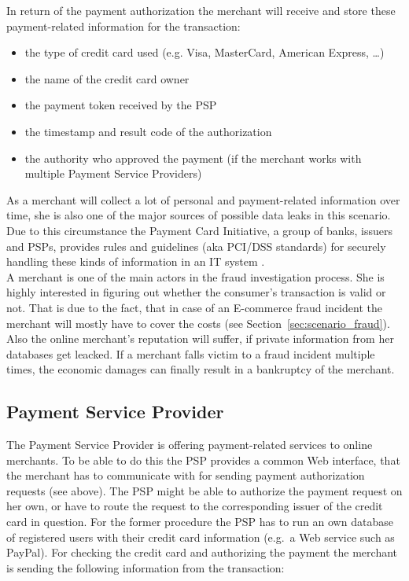 In return of the payment authorization the merchant will receive and store these  payment-related information for the transaction:\@

\begin{itemize}
		\item the type of credit card used (e.g. Visa, MasterCard, American Express, \ldots)
		\item the name of the credit card owner
		\item the payment token received by the \gls{PSP}
		\item the timestamp and result code of the authorization
		\item the authority who approved the payment (if the merchant works with multiple Payment Service Providers)
\end{itemize}

As a merchant will collect a lot of personal and payment-related information over time, she is also one of the major sources of possible data leaks in this scenario. Due to this circumstance the Payment Card Initiative, a group of banks, issuers and \gls{PSP}s, provides rules and guidelines (aka PCI/DSS standards) for securely handling these kinds of information in an IT system \citep{virtue2009payment}. \\

A merchant is one of the main actors in the fraud investigation process. She is highly interested in figuring out whether the consumer's transaction is valid or not. That is due to the fact, that in case of an E-commerce fraud incident the merchant will mostly have to cover the costs (see Section~\ref{sec:scenario_fraud}). Also the online merchant's reputation will suffer, if private information from her databases get leacked. If a merchant falls victim to a fraud incident multiple times, the economic damages can finally result in a bankruptcy of the merchant.


\subsection{Payment Service Provider}
\label{subsec:stakeholder_psp}

The Payment Service Provider is offering payment-related services to online merchants. To be able to do this the \gls{PSP} provides a common Web interface, that the merchant has to communicate with for sending payment authorization requests (see above). The \gls{PSP} might be able to authorize the payment request on her own, or have to route the request to the corresponding issuer of the credit card in question. For the former procedure the \gls{PSP} has to run an own database of registered users with their credit card information (e.g.\ a Web service such as PayPal). For checking the credit card and authorizing the payment the merchant is sending the following information from the transaction:\@

